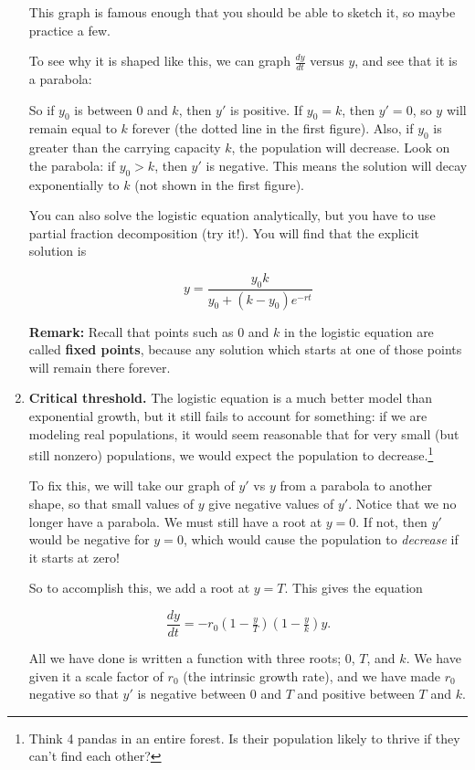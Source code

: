 \documentclass[a5paper]{article}
\theoremstyle{definition}%
\numberwithin{exercise}{section}
\theoremstyle{remark}%
\begin{document}
\begin{enumerate}[label=\Alph*:]

This graph is famous enough that you should be able to sketch it, so maybe practice a few. 

To see why it is shaped like this, we can graph $\frac{dy}{dt}$ versus $y$, and see that it is a parabola:


So if $y_0$ is between $0$ and $k$, then $y'$ is positive. If $y_0=k$, then $y'=0$, so $y$ will remain equal to $k$ forever (the dotted line in the first figure). Also, if $y_0$ is greater than the carrying capacity $k$, the population will decrease. Look on the parabola: if $y_0>k$, then $y'$ is negative. This means the solution will decay exponentially to $k$ (not shown in the first figure).

You can also solve the logistic equation analytically, but you have to use partial fraction decomposition (try it!). You will find that the explicit solution is 
\begin{highlight}
\[y=\frac{y_0k}{y_0+(k-y_0)e^{-rt}}\]
\end{highlight}

\textbf{Remark:} Recall that points such as $0$ and $k$ in the logistic equation are called \textbf{fixed points}, because any solution which starts at one of those points will remain there forever. 

\item \textbf{Critical threshold.} The logistic equation is a much better model than exponential growth, but it still fails to account for something: if we are modeling real populations, it would seem reasonable that for very small (but still nonzero) populations, we would expect the population to decrease.\footnote{Think 4 pandas in an entire forest. Is their population likely to thrive if they can't find each other?} 

To fix this, we will take our graph of $y'$ vs $y$ from a parabola  to another shape, so that small values of $y$ give negative values of $y'$. 
Notice that we no longer have a parabola. We must still have a root at $y=0$. If not, then $y'$ would be negative for $y=0$, which would cause the population to \emph{decrease} if it starts at zero!

So to accomplish this, we add a root at $y=T$. This gives the equation
\begin{highlight}
$$\frac{dy}{dt}=-r_0\left(1-\tfrac{y}{T}\right)\left(1-\tfrac{y}{k}\right)y.$$
\end{highlight}
All we have done is written a function with three roots; 0, $T$, and $k$. We have given it a scale factor of $r_0$ (the intrinsic growth rate), and we have made $r_0$ negative so that $y'$ is negative between 0 and $T$ and positive between $T$ and $k$. 


\end{enumerate}
\end{document}
